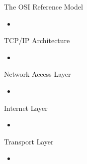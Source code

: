\documentclass{beamer}
\begin{document}
\begin{frame}{The OSI Reference Model}

\begin{itemize}
\item
\end{itemize}

\end{frame}

\begin{frame}{TCP/IP Architecture}

\begin{itemize}
\item
\end{itemize}

\end{frame}

\begin{frame}{Network Access Layer}

\begin{itemize}
\item
\end{itemize}

\end{frame}

\begin{frame}{Internet Layer}

\begin{itemize}
\item
\end{itemize}

\end{frame}

\begin{frame}{Transport Layer}

\begin{itemize}
\item
\end{itemize}

\end{frame}
\end{document}
